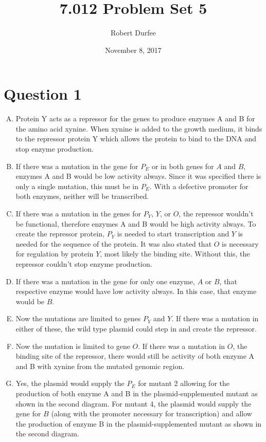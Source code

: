 \documentclass{article}
\title{7.012 Problem Set 5}
\author{Robert Durfee}
\date{November 8, 2017}
\begin{document}
\maketitle

\section*{Question 1}

\begin{enumerate}[A.]
    \item Protein Y acts as a repressor for the genes to produce enzymes A and B
        for the amino acid xynine. When xynine is added to the growth medium, it
        binds to the repressor protein Y which allows the protein to bind to the
        DNA and stop enzyme production.
    
    \item If there was a mutation in the gene for $P_{E}$ or in both genes for
        $A$ and $B$, enzymes A and B would be low activity always. Since it was
        specified there is only a single mutation, this must be in $P_{E}$. With
        a defective promoter for both enzymes, neither will be transcribed.
    
    \item If there was a mutation in the genes for $P_{Y}$, $Y$, or $O$, the
        repressor wouldn't be functional, therefore enzymes A and B would be
        high activity always. To create the repressor protein, $P_{Y}$ is needed
        to start transcription and $Y$ is needed for the sequence of the
        protein. It was also stated that $O$ is necessary for regulation by
        protein $Y$, most likely the binding site. Without this, the repressor
        couldn't stop enzyme production.
    
    \item If there was a mutation in the gene for only one enzyme, $A$ or $B$,
        that respective enzyme would have low activity always. In this case,
        that enzyme would be $B$.
    
    \item Now the mutations are limited to genes $P_{Y}$ and $Y$. If there was a
        mutation in either of these, the wild type plasmid could step in and
        create the repressor. 
    
    \item Now the mutation is limited to gene $O$. If there was a mutation in
        $O$, the binding site of the repressor, there would still be activity of
        both enzyme A and B with xynine from the mutated genomic region.
    
    \item Yes, the plasmid would supply the $P_{E}$ for mutant 2 allowing for
        the production of both enzyme A and B in the plasmid-supplemented mutant
        as shown in the second diagram. For mutant 4, the plasmid would supply
        the gene for $B$ (along with the promoter necessary for transcription)
        and allow the production of enzyme B in the plasmid-supplemented mutant
        as shown in the second diagram.
    
\end{enumerate}
\end{document}

